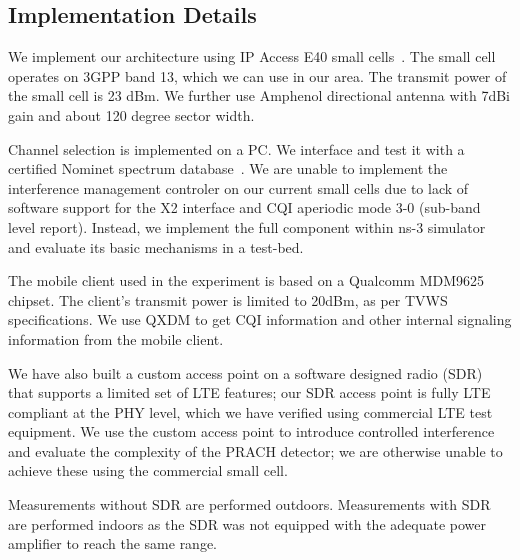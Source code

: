 \subsection{Implementation Details}
\label{sec:implementation}

We implement our architecture using IP Access E40 small cells~\cite{ipa}. The small cell operates on 3GPP band 13, which we can use in our area. 
The transmit power of the small cell is 23 dBm. We further use Amphenol directional antenna with 7dBi gain and about 120 degree sector width. 

Channel selection is implemented on a PC. We interface and test it with a certified Nominet spectrum database~\cite{nominet}. 
We are unable to implement the interference management controler on our current small cells due to lack of software support for the X2 interface and CQI aperiodic mode 3-0 (sub-band level report). Instead, we implement the full component within ns-3 simulator and evaluate its basic mechanisms in a test-bed.

The mobile client used in the experiment is based on a Qualcomm MDM9625 chipset. 
The client's transmit power is limited to 20dBm, as per TVWS specifications. 
We use QXDM to get CQI information and other internal signaling information from the mobile client.

We have also built a custom access point on a software designed radio (SDR) that supports a limited set of LTE features; 
our SDR access point is fully LTE compliant at the PHY level, which we have verified using commercial LTE test equipment.
We use the custom access point to introduce controlled interference and evaluate the complexity of the PRACH detector;
we are otherwise unable to achieve these using the commercial small cell. 

Measurements without SDR are performed outdoors. Measurements with SDR are performed indoors as the SDR was not equipped with the adequate power amplifier to reach the same range. 






